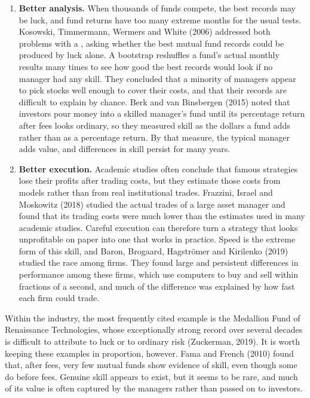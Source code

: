 \begin{itemize}
\begin{enumerate}
    \item \textbf{Better analysis.} When thousands of funds compete, the best
  records may be luck, and fund returns have too many extreme months for the
  usual tests. Kosowski, Timmermann, Wermers and White (2006) addressed both
  problems with a , asking whether the best mutual
  fund records could be produced by luck alone. A bootstrap reshuffles a fund's actual monthly
  results many times to see how good the best records would look if no
  manager had any skill. They concluded that a minority of managers appear
  to pick stocks well enough to cover their costs, and that their records are
  difficult to explain by chance. Berk and van Binsbergen (2015) noted that
  investors pour money into a skilled manager's fund until its percentage
  return after fees looks ordinary, so they measured skill as the dollars a
  fund adds rather than as a percentage return. By
  that measure, the typical manager adds value, and differences in skill
  persist for many years. 

    \item \textbf{Better execution.} Academic studies often conclude that
  famous strategies lose their profits after trading costs, but they estimate
  those costs from models rather than from real institutional trades.
  Frazzini, Israel and Moskowitz (2018) studied the actual trades of a large
  asset manager and found that its trading costs were much lower than the
  estimates used in many academic studies. Careful
  execution can therefore turn a strategy that looks unprofitable on paper
  into one that works in practice. Speed is the extreme form of this
  skill, and Baron, Brogaard, Hagstr\"om{}er and Kirilenko (2019) studied the
  race among  firms. They found large and persistent
  differences in performance among these firms, which use computers to buy and sell
  within fractions of a second, and much of the difference was
  explained by how fast each firm could trade.
  
  \end{enumerate}

  Within the industry, the most frequently cited example is the Medallion
  Fund of Renaissance Technologies, whose exceptionally strong record over
  several decades is difficult to attribute to luck or to ordinary risk
  (Zuckerman, 2019). It is worth keeping these examples in proportion,
  however. Fama and French (2010) found that, after fees, very few mutual
  funds show evidence of skill, even though some do before fees. Genuine
  skill appears to exist, but it seems to be rare, and much of its value is
  often captured by the managers rather than passed on to investors.
  
  
\end{itemize}



